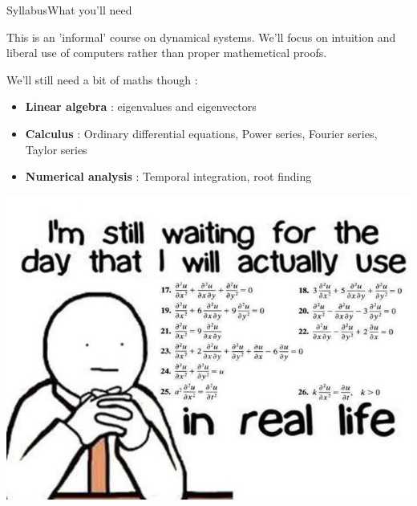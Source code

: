\documentclass[usenames,dvipsnames,svgnames,10pt,aspectratio=169]{beamer}
\begin{document}
\begin{frame}[t, c]{Syllabus}{What you'll need}
  \begin{minipage}{.58\textwidth}
    This is an 'informal' course on dynamical systems.
    We'll focus on intuition and liberal use of computers rather than proper mathemetical proofs.

    \bigskip

    We'll still need a bit of maths though :
    \begin{itemize}
    \item \textbf{Linear algebra} : eigenvalues and eigenvectors
    \item \textbf{Calculus} : Ordinary differential equations, Power series, Fourier series, Taylor series
    \item \textbf{Numerical analysis} : Temporal integration, root finding
    \end{itemize}
  \end{minipage}%
  \hfill
  \begin{minipage}{.38\textwidth}
    \centering
    \includegraphics[width=\textwidth]{still_waiting}
  \end{minipage}

  \vspace{1cm}
\end{frame}
\end{document}

